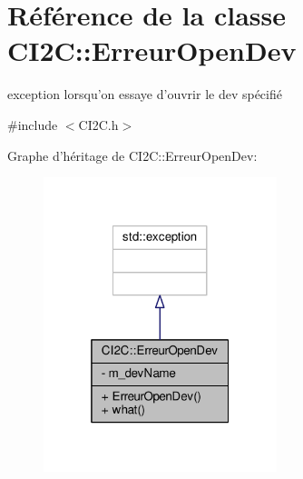\hypertarget{classCI2C_1_1ErreurOpenDev}{\section{Référence de la classe C\+I2\+C\+:\+:Erreur\+Open\+Dev}
\label{classCI2C_1_1ErreurOpenDev}
}


exception lorsqu'on essaye d'ouvrir le dev spécifié  




{\ttfamily \#include $<$C\+I2\+C.\+h$>$}



Graphe d'héritage de C\+I2\+C\+:\+:Erreur\+Open\+Dev\+:\nopagebreak
\begin{figure}[H]
\begin{center}
\leavevmode
\includegraphics[width=193pt]{classCI2C_1_1ErreurOpenDev__inherit__graph}
\end{center}
\end{figure}


